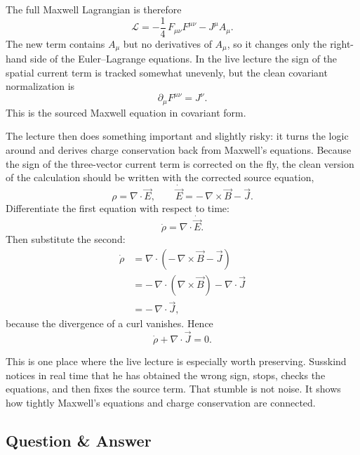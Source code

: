 The full Maxwell Lagrangian is therefore
\begin{equation}
\mathcal L
=
-\frac14\,F_{\mu\nu}F^{\mu\nu}
-
J^\mu A_\mu.
\end{equation}
The new term contains \(A_\mu\) but no derivatives of \(A_\mu\), so it changes only the right-hand side of the Euler--Lagrange equations. In the live lecture the sign of the spatial current term is tracked somewhat unevenly, but the clean covariant normalization is
\begin{equation}
\partial_\mu F^{\mu\nu}=J^\nu.
\end{equation}
This is the sourced Maxwell equation in covariant form.

The lecture then does something important and slightly risky: it turns the logic around and derives charge conservation back from Maxwell's equations. Because the sign of the three-vector current term is corrected on the fly, the clean version of the calculation should be written with the corrected source equation,
\begin{equation}
\rho=\nabla\cdot\vec E,
\qquad
\dot{\vec E}=-\,\nabla\times\vec B-\vec J.
\end{equation}
Differentiate the first equation with respect to time:
\begin{equation}
\dot\rho=\nabla\cdot\dot{\vec E}.
\end{equation}
Then substitute the second:
\begin{align}
\dot\rho
&=
\nabla\cdot\left(-\,\nabla\times\vec B-\vec J\right)
\\
&=
-\,\nabla\cdot(\nabla\times\vec B)-\nabla\cdot\vec J
\\
&=
-\,\nabla\cdot\vec J,
\end{align}
because the divergence of a curl vanishes. Hence
\begin{equation}
\dot\rho+\nabla\cdot\vec J=0.
\end{equation}

\begin{remark}
This is one place where the live lecture is especially worth preserving. Susskind notices in real time that he has obtained the wrong sign, stops, checks the equations, and then fixes the source term. That stumble is not noise. It shows how tightly Maxwell's equations and charge conservation are connected.
\end{remark}

\subsection{Question \& Answer}

